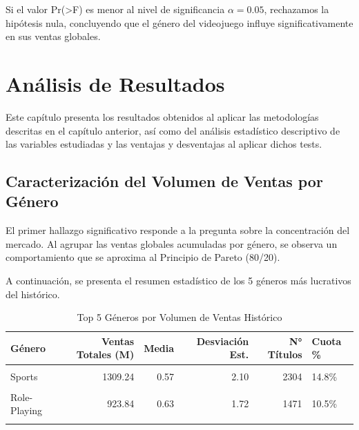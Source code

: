 \documentclass[oneside,11pt]{Latex/Classes/PhDthesisPSnPDF}
\begin{document}
Si el valor Pr(\textgreater F) es menor al nivel de significancia
\(\alpha = 0.05\), rechazamos la hipótesis nula, concluyendo que el
género del videojuego influye significativamente en sus ventas globales.

\chapter{Análisis de Resultados}

\small Este capítulo presenta los resultados obtenidos al aplicar las
metodologías descritas en el capítulo anterior, así como del análisis
estadístico descriptivo de las variables estudiadas y las ventajas y
desventajas al aplicar dichos tests.

\section{Caracterización del Volumen de Ventas por Género}

El primer hallazgo significativo responde a la pregunta sobre la
concentración del mercado. Al agrupar las ventas globales acumuladas por
género, se observa un comportamiento que se aproxima al Principio de
Pareto (80/20).

A continuación, se presenta el resumen estadístico de los 5 géneros más
lucrativos del histórico.

\begin{table}[!h]
\centering
\caption{\label{tab:clean_data}Top 5 Géneros por Volumen de Ventas Histórico}
\centering
\fontsize{10}{12}\selectfont
\begin{tabular}[t]{lrrrrl}
\toprule
Género & Ventas Totales (M) & Media & Desviación Est. & N° Títulos & Cuota \%\\
\midrule
\cellcolor{gray!10}{Action} & \cellcolor{gray!10}{1722.88} & \cellcolor{gray!10}{0.53} & \cellcolor{gray!10}{1.16} & \cellcolor{gray!10}{3253} & \cellcolor{gray!10}{19.5\%}\\
Sports & 1309.24 & 0.57 & 2.10 & 2304 & 14.8\%\\
\cellcolor{gray!10}{Shooter} & \cellcolor{gray!10}{1026.20} & \cellcolor{gray!10}{0.80} & \cellcolor{gray!10}{1.83} & \cellcolor{gray!10}{1282} & \cellcolor{gray!10}{11.6\%}\\
Role-Playing & 923.84 & 0.63 & 1.72 & 1471 & 10.5\%\\
\cellcolor{gray!10}{Platform} & \cellcolor{gray!10}{829.15} & \cellcolor{gray!10}{0.95} & \cellcolor{gray!10}{2.60} & \cellcolor{gray!10}{876} & \cellcolor{gray!10}{9.4\%}\\
\bottomrule
\end{tabular}
\end{table}
\end{document}
